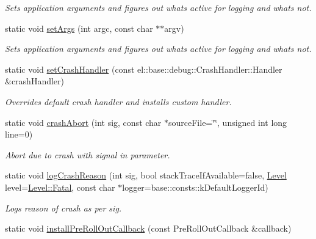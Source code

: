 \begin{DoxyCompactItemize}
\begin{DoxyCompactList}\small\item\em Sets application arguments and figures out whats active for logging and whats not. \end{DoxyCompactList}\item 
static void \hyperlink{classel_1_1Helpers_afac7a023e2c13a62d0295cf0239eb848}{set\-Args} (int argc, const char $\ast$$\ast$argv)
\begin{DoxyCompactList}\small\item\em Sets application arguments and figures out whats active for logging and whats not. \end{DoxyCompactList}\item 
static void \hyperlink{classel_1_1Helpers_a4155f6fff0074ad93aa56fd7fe064097}{set\-Crash\-Handler} (const el\-::base\-::debug\-::\-Crash\-Handler\-::\-Handler \&crash\-Handler)
\begin{DoxyCompactList}\small\item\em Overrides default crash handler and installs custom handler. \end{DoxyCompactList}\item 
static void \hyperlink{classel_1_1Helpers_a6e16f0e07ce40e0659fcfec4ea5b6fe1}{crash\-Abort} (int sig, const char $\ast$source\-File=\char`\"{}\char`\"{}, unsigned int long line=0)
\begin{DoxyCompactList}\small\item\em Abort due to crash with signal in parameter. \end{DoxyCompactList}\item 
static void \hyperlink{classel_1_1Helpers_abf1ae61428740e1e6c5d5f0c36500faa}{log\-Crash\-Reason} (int sig, bool stack\-Trace\-If\-Available=false, \hyperlink{namespaceel_ab0ac6091262344c52dd2d3ad099e8e36}{Level} level=\hyperlink{namespaceel_ab0ac6091262344c52dd2d3ad099e8e36a882384ec38ce8d9582b57e70861730e4}{Level\-::\-Fatal}, const char $\ast$logger=base\-::consts\-::k\-Default\-Logger\-Id)
\begin{DoxyCompactList}\small\item\em Logs reason of crash as per sig. \end{DoxyCompactList}\item 
\hypertarget{classel_1_1Helpers_a5fd7ad6d636c28d2e706203d0c43cf8c}{static void \hyperlink{classel_1_1Helpers_a5fd7ad6d636c28d2e706203d0c43cf8c}{install\-Pre\-Roll\-Out\-Callback} (const Pre\-Roll\-Out\-Callback \&callback)}\label{classel_1_1Helpers_a5fd7ad6d636c28d2e706203d0c43cf8c}


\end{DoxyCompactItemize}
